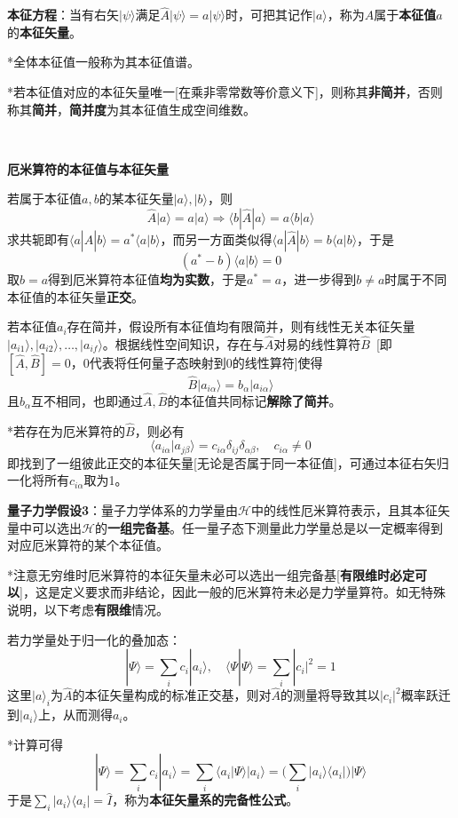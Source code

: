 \documentclass[a4paper,UTF8,fontset=windows]{ctexart}
\newcommand*{\ket}[1]{|#1\rangle}
\newcommand*{\bra}[1]{\langle#1|}
\newcommand*{\bk}[2]{\langle#1|#2\rangle}
\newcommand*{\blk}[3]{\langle#1|#2|#3\rangle}
\begin{document}
\textbf{本征方程}：当有右矢$\ket{\psi}$满足$\hat{A}\ket{\psi}=a\ket{\psi}$时，可把其记作$\ket{a}$，称为$\hat{A}$属于\textbf{本征值}$a$的\textbf{本征矢量}。

*全体本征值一般称为其本征值谱。

*若本征值对应的本征矢量唯一[在乘非零常数等价意义下]，则称其\textbf{非简并}，否则称其\textbf{简并}，\textbf{简并度}为其本征值生成空间维数。

\

\textbf{厄米算符的本征值与本征矢量}

若属于本征值$a,b$的某本征矢量$\ket{a},\ket{b}$，则
$$\hat{A}\ket{a}=a\ket{a}\Rightarrow\blk{b}{\hat{A}}{a}=a\bk{b}{a}$$
求共轭即有$\blk{a}{\hat{A}}{b}=a^*\bk{a}{b}$，而另一方面类似得$\blk{a}{\hat{A}}{b}=b\bk{a}{b}$，于是
$$(a^*-b)\bk{a}{b}=0$$
取$b=a$得到厄米算符本征值\textbf{均为实数}，于是$a^*=a$，进一步得到$b\ne a$时属于不同本征值的本征矢量\textbf{正交}。

若本征值$a_i$存在简并，假设所有本征值均有限简并，则有线性无关本征矢量$\ket{a_{i1}},\ket{a_{i2}},\dots,\ket{a_{if}}$。根据线性空间知识，存在与$\hat{A}$对易的线性算符$\hat{B}$\ [即$[\hat{A},\hat{B}]=0$，0代表将任何量子态映射到0的线性算符]使得
$$\hat{B}\ket{a_{i\alpha}}=b_\alpha\ket{a_{i\alpha}}$$
且$b_\alpha$互不相同，也即通过$\hat{A},\hat{B}$的本征值共同标记\textbf{解除了简并}。

*若存在为厄米算符的$\hat{B}$，则必有
$$\bk{a_{i\alpha}}{a_{j\beta}}=c_{i\alpha}\delta_{ij}\delta_{\alpha\beta},\quad c_{i\alpha}\ne0$$
即找到了一组彼此正交的本征矢量[无论是否属于同一本征值]，可通过本征右矢归一化将所有$c_{i\alpha}$取为1。

\textbf{量子力学假设3}：量子力学体系的力学量由$\mathcal{H}$中的线性厄米算符表示，且其本征矢量中可以选出$\mathcal{H}$的\textbf{一组完备基}。任一量子态下测量此力学量总是以一定概率得到对应厄米算符的某个本征值。

*注意无穷维时厄米算符的本征矢量未必可以选出一组完备基[\textbf{有限维时必定可以}]，这是定义要求而非结论，因此一般的厄米算符未必是力学量算符。如无特殊说明，以下考虑\textbf{有限维}情况。

若力学量处于归一化的叠加态：
$$\ket{\Psi}=\sum_ic_i\ket{a_i},\quad\bk{\Psi}{\Psi}=\sum_i|c_i|^2=1$$
这里$\ket{a}_i$为$\hat{A}$的本征矢量构成的标准正交基，则对$\hat{A}$的测量将导致其以$|c_i|^2$概率跃迁到$\ket{a_i}$上，从而测得$a_i$。

*计算可得
$$\ket{\Psi}=\sum_ic_i\ket{a_i}=\sum_i\bk{a_i}{\Psi}\ket{a_i}=\bigg(\sum_i\ket{a_i}\bra{a_i}\bigg)\ket{\Psi}$$
于是$\sum_i\ket{a_i}\bra{a_i}=\hat{I}$，称为\textbf{本征矢量系的完备性公式}。
\end{document}
